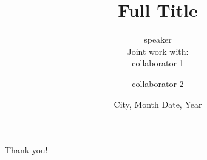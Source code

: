 \documentclass[10pt, fleqn,xcolor=dvipsnames]{beamer}
\title[Short Title]{Full Title}
\author[speaker]
{
    speaker\inst{1}\\[2em]
    Joint work with:\\
    collaborator 1\inst{2} \and  collaborator 2\inst{3} 
}
\institute
{
    \inst{1}
    Affliation 1
    \and
    \inst{2}
    Affliation 2
    \and 
    \inst{3}
    Affliation 3
    
}
\date{City, Month Date, Year}
\begin{document}
\begin{frame}
\maketitle
\end{frame}



\begin{frame}[plain]

    \begin{center}
	   \calligra \Huge Thank you! 
    \end{center}
\end{frame}
\end{document}
